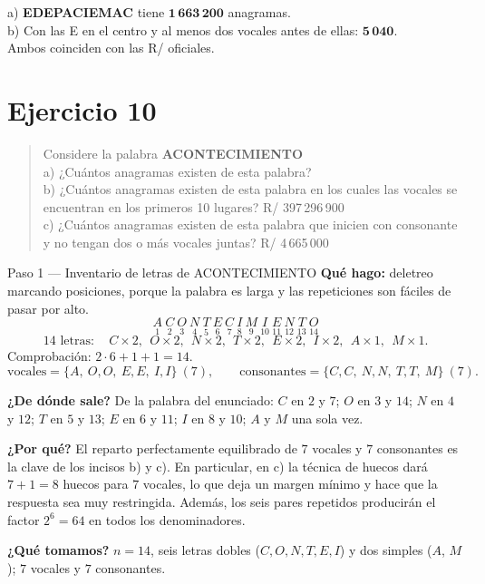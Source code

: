 \documentclass[11pt]{article}
\begin{document}
\begin{resp}
a) \textbf{EDEPACIEMAC} tiene $\mathbf{1\,663\,200}$ anagramas.\\
b) Con las E en el centro y al menos dos vocales antes de ellas: $\mathbf{5\,040}$.\\
Ambos coinciden con las R/ oficiales.
\end{resp}

\section*{Ejercicio 10}

\begin{quote}
Considere la palabra \textbf{ACONTECIMIENTO}\\
a) ¿Cuántos anagramas existen de esta palabra?\\
b) ¿Cuántos anagramas existen de esta palabra en los cuales las vocales se encuentran en los primeros 10
lugares? \hfill R/ 397\,296\,900\\
c) ¿Cuántos anagramas existen de esta palabra que inicien con consonante y no tengan dos o más vocales
juntas? \hfill R/ 4\,665\,000
\end{quote}

\begin{paso}{Paso 1 --- Inventario de letras de ACONTECIMIENTO}
\textbf{Qué hago:} deletreo marcando posiciones, porque la palabra es larga y las repeticiones son fáciles
de pasar por alto.
\[
\underset{1}{A}\ \underset{2}{C}\ \underset{3}{O}\ \underset{4}{N}\ \underset{5}{T}\ \underset{6}{E}\
\underset{7}{C}\ \underset{8}{I}\ \underset{9}{M}\ \underset{10}{I}\ \underset{11}{E}\ \underset{12}{N}\
\underset{13}{T}\ \underset{14}{O}
\]
\[
14 \text{ letras}:\quad C\times2,\ \ O\times2,\ \ N\times2,\ \ T\times2,\ \ E\times2,\ \ I\times2,\ \
A\times1,\ \ M\times1 .
\]
Comprobación: $2\cdot 6 + 1 + 1 = 14$. \checkmark
\[
\text{vocales} = \{A,\ O,O,\ E,E,\ I,I\}\ (7),\qquad
\text{consonantes} = \{C,C,\ N,N,\ T,T,\ M\}\ (7).
\]

\textbf{¿De dónde sale?} De la palabra del enunciado: $C$ en $2$ y $7$; $O$ en $3$ y $14$; $N$ en $4$ y $12$;
$T$ en $5$ y $13$; $E$ en $6$ y $11$; $I$ en $8$ y $10$; $A$ y $M$ una sola vez.

\textbf{¿Por qué?} El reparto perfectamente equilibrado de $7$ vocales y $7$ consonantes es la clave de los
incisos b) y c). En particular, en c) la técnica de huecos dará $7+1=8$ huecos para $7$ vocales, lo que deja
un margen mínimo y hace que la respuesta sea muy restringida. Además, los seis pares repetidos producirán el
factor $2^6=64$ en todos los denominadores.

\textbf{¿Qué tomamos?} $n=14$, seis letras dobles ($C,O,N,T,E,I$) y dos simples ($A$, $M$); $7$ vocales y
$7$ consonantes.
\end{paso}
\end{document}
